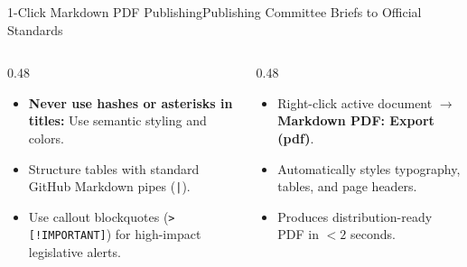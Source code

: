 \documentclass[aspectratio=169, 10pt]{beamer}
\begin{document}
\begin{frame}{1-Click Markdown PDF Publishing}{Publishing Committee Briefs to Official Standards}
  \begin{columns}[c]
    \begin{column}{0.48\textwidth}
      \begin{tcolorbox}[colback=lightgrey, colframe=tanzaniablue, arc=1.5mm, boxrule=0.8pt, title=\textbf{Markdown Formatting Hygiene}]
        \small
        \begin{itemize}
          \item \textbf{\textcolor{tanzaniablue}{Never use hashes or asterisks in titles:}} Use semantic styling and colors.
          \item Structure tables with standard GitHub Markdown pipes (\texttt{|}).
          \item Use callout blockquotes (\texttt{> [!IMPORTANT]}) for high-impact legislative alerts.
        \end{itemize}
      \end{tcolorbox}
    \end{column}
    \begin{column}{0.48\textwidth}
      \begin{tcolorbox}[colback=lightgrey, colframe=suagreen, arc=1.5mm, boxrule=0.8pt, title=\textbf{1-Click PDF Generation}]
        \small
        \begin{itemize}
          \item Right-click active document $\rightarrow$ \textcolor{suagreen}{\textbf{Markdown PDF: Export (pdf)}}.
          \item Automatically styles typography, tables, and page headers.
          \item Produces distribution-ready PDF in $<2$ seconds.
        \end{itemize}
      \end{tcolorbox}
    \end{column}
  \end{columns}
\end{frame}
\end{document}
